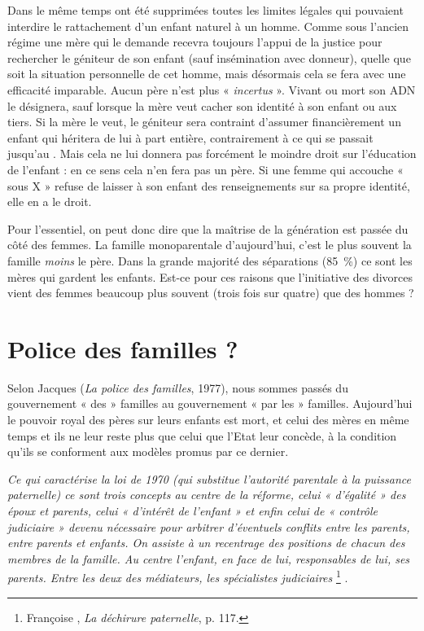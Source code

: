  Dans le même temps ont été supprimées toutes les limites légales qui pouvaient interdire le rattachement d'un enfant naturel à un homme. Comme sous l'ancien régime une mère qui le demande recevra toujours l'appui de la justice pour rechercher le géniteur de son enfant (sauf insémination avec donneur), quelle que soit la situation personnelle de cet homme, mais désormais cela se fera avec une efficacité  imparable. Aucun père n'est plus « \emph{incertus} ». Vivant ou mort son ADN le désignera, sauf lorsque la mère veut cacher son identité à son enfant ou aux tiers. Si la mère le veut, le géniteur sera contraint d'assumer financièrement un enfant qui héritera de lui à part entière, contrairement à ce qui se passait jusqu'au . Mais cela ne lui donnera pas forcément le moindre droit sur l'éducation de l'enfant : en ce sens cela n'en fera pas un père. Si une femme qui accouche « sous X » refuse de laisser à son enfant des renseignements sur sa propre identité, elle en a le droit. 

 Pour l'essentiel, on peut donc dire que la maîtrise de la génération est passée du côté des femmes. La famille monoparentale d'aujourd'hui, c'est le plus souvent la famille \emph{moins} le père. Dans la grande majorité des séparations (85~\%) ce sont les mères qui gardent les enfants. Est-ce pour ces raisons que l'initiative des divorces vient des femmes beaucoup plus souvent (trois fois sur quatre) que des hommes  ? 




  \section{Police des familles ?}
 
 
Selon Jacques  (\emph{La police des familles}, 1977), nous sommes passés du gouvernement « des » familles au gouvernement « par les » familles.  Aujourd'hui le pouvoir royal des pères sur leurs enfants est mort, et celui des mères en même temps et ils ne leur reste plus que celui que l'Etat leur concède, à la condition qu'ils se conforment aux modèles promus par ce dernier.

\begin{displayquote}
{\emph{Ce qui caractérise la loi de 1970 (qui substitue l'autorité parentale à la puissance paternelle) ce sont trois concepts au centre de la réforme, celui « d'égalité » des époux et parents, celui « d'intérêt de l'enfant » et enfin celui de « contrôle judiciaire » devenu nécessaire pour arbitrer d'éventuels conflits entre les parents, entre parents et enfants. On assiste à un recentrage des positions de chacun des membres de la famille. Au centre l'enfant, en face de lui, responsables de lui, ses parents. Entre les deux des médiateurs, les spécialistes judiciaires}%
\footnote{Françoise , \emph{La déchirure paternelle}, p. 117.}%
}.
\end{displayquote}


